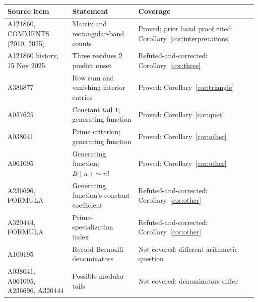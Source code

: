 \begingroup\small
\begin{longtable}{@{}>{\raggedright\arraybackslash}p{}>{\raggedright\arraybackslash}p{}>{\raggedright\arraybackslash}p{}@{}}
\toprule
Source item & Statement & Coverage \\
\midrule
\endhead
A121860, COMMENTS (2019, 2025) & Matrix and rectangular-band counts & Proved; prior band proof cited: Corollary~\ref{cor:interpretations} \\
A121860 history, 15 Nov 2025 & Three residues $2$ predict onset & Refuted-and-corrected: Corollary~\ref{cor:three} \\
A386877 & Row sum and vanishing interior entries & Proved: Corollary~\ref{cor:triangle} \\
A057625 & Constant tail $1$; generating function & Proved: Corollary~\ref{cor:quet} \\
A038041 & Prime criterion; generating function & Proved: Corollary~\ref{cor:other} \\
A061095 & Generating function; $B(n)\sim n!$ & Proved: Corollary~\ref{cor:other} \\
A236696, FORMULA & Generating function's constant coefficient & Refuted-and-corrected: Corollary~\ref{cor:other} \\
A320444, FORMULA & Prime-specialization index & Refuted-and-corrected: Corollary~\ref{cor:other} \\
A100195 \cite{a100195} & Record Bernoulli denominators & Not covered: different arithmetic question \\
A038041, A061095, A236696, A320444 & Possible modular tails & Not covered: denominators differ \\
\bottomrule
\end{longtable}
\endgroup
